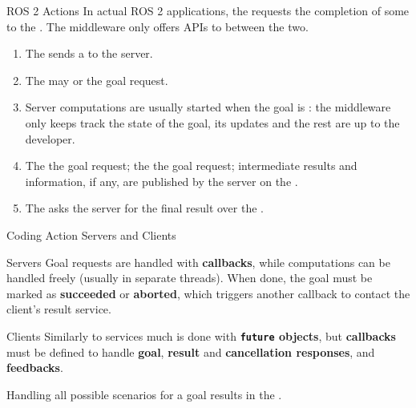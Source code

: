 \begin{frame}{ROS 2 Actions}
In actual ROS 2 applications, the  requests the completion of some  to the . The middleware only offers APIs to  between the two.
\begin{enumerate}
  \item The  sends a  to the server.
  \item The  may  or  the goal request.
  \item Server computations are usually started when the goal is : the middleware only keeps track the state of the goal, its updates and the rest are up to the developer.
  \item The  the goal request; the  the goal request; intermediate results and information, if any, are published by the server on the .
  \item The  asks the server for the final result over the .
\end{enumerate}
\end{frame}

\begin{frame}{Coding Action Servers and Clients}
\begin{block}{Servers}
Goal requests are handled with \textbf{callbacks}, while computations can be handled freely (usually in separate threads). When done, the goal must be marked as \textbf{succeeded} or \textbf{aborted}, which triggers another callback to contact the client's result service.
\end{block}
\begin{block}{Clients}
Similarly to services much is done with \textbf{\texttt{future} objects}, but \textbf{callbacks} must be defined to handle \textbf{goal}, \textbf{result} and \textbf{cancellation responses}, and \textbf{feedbacks}.
\end{block}
Handling all possible scenarios for a goal results in the . {\Large\smiley{}}
\end{frame}

